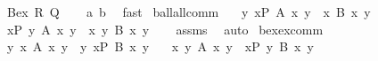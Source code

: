 \begin{isabellebody}
\ \ \ {\isachardoublequoteopen}Bex\ R\ Q{\isachardoublequoteclose}\isanewline
%
\isadelimproof
\ \ %
\endisadelimproof
%
\isatagproof
{}\isamarkupfalse%
\ a\ b\ \isamarkupfalse%
\ fast%
\endisatagproof
{\isafoldproof}%
%
\isadelimproof
\isanewline
%
\endisadelimproof
\isanewline
\isanewline
{}\isamarkupfalse%
\ ball{\isacharunderscore}{\kern0pt}all{\isacharunderscore}{\kern0pt}comm{\isacharcolon}{\kern0pt}\isanewline
\ \ \ {\isachardoublequoteopen}{\isasymAnd}y{\isachardot}{\kern0pt}\ {\isacharparenleft}{\kern0pt}{\isasymforall}x{\isasymin}P{\isachardot}{\kern0pt}\ A\ x\ y{\isacharparenright}{\kern0pt}\ {\isasymlongrightarrow}\ {\isacharparenleft}{\kern0pt}{\isasymforall}x{\isachardot}{\kern0pt}\ B\ x\ y{\isacharparenright}{\kern0pt}{\isachardoublequoteclose}\isanewline
\ \ \ {\isachardoublequoteopen}{\isacharparenleft}{\kern0pt}{\isasymforall}x{\isasymin}P{\isachardot}{\kern0pt}\ {\isasymforall}y{\isachardot}{\kern0pt}\ A\ x\ y{\isacharparenright}{\kern0pt}\ {\isasymlongrightarrow}\ {\isacharparenleft}{\kern0pt}{\isasymforall}x{\isachardot}{\kern0pt}\ {\isasymforall}y{\isachardot}{\kern0pt}\ B\ x\ y{\isacharparenright}{\kern0pt}{\isachardoublequoteclose}\isanewline
%
\isadelimproof
\ \ %
\endisadelimproof
%
\isatagproof
{}\isamarkupfalse%
\ assms\ \isamarkupfalse%
\ auto%
\endisatagproof
{\isafoldproof}%
%
\isadelimproof
\isanewline
%
\endisadelimproof
\isanewline
{}\isamarkupfalse%
\ bex{\isacharunderscore}{\kern0pt}ex{\isacharunderscore}{\kern0pt}comm{\isacharcolon}{\kern0pt}\isanewline
\ \ \ {\isachardoublequoteopen}{\isacharparenleft}{\kern0pt}{\isasymexists}y{\isachardot}{\kern0pt}\ {\isasymexists}x{\isachardot}{\kern0pt}\ A\ x\ y{\isacharparenright}{\kern0pt}\ {\isasymlongrightarrow}\ {\isacharparenleft}{\kern0pt}{\isasymexists}y{\isachardot}{\kern0pt}\ {\isasymexists}x{\isasymin}P{\isachardot}{\kern0pt}\ B\ x\ y{\isacharparenright}{\kern0pt}{\isachardoublequoteclose}\isanewline
\ \ \ {\isachardoublequoteopen}{\isacharparenleft}{\kern0pt}{\isasymexists}x{\isachardot}{\kern0pt}\ {\isasymexists}y{\isachardot}{\kern0pt}\ A\ x\ y{\isacharparenright}{\kern0pt}\ {\isasymlongrightarrow}\ {\isacharparenleft}{\kern0pt}{\isasymexists}x{\isasymin}P{\isachardot}{\kern0pt}\ {\isasymexists}y{\isachardot}{\kern0pt}\ B\ x\ y{\isacharparenright}{\kern0pt}{\isachardoublequoteclose}\isanewline
%
\isadelimproof
\ \ %
\endisadelimproof
%
\isatagproof
{}\isamarkupfalse%

\end{isabellebody}
